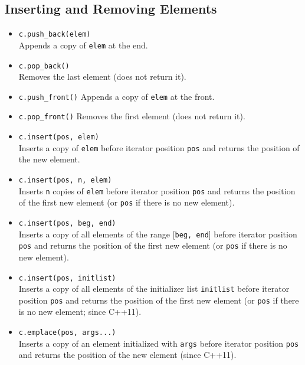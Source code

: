 \documentclass{report}
\begin{document}
\subsection{Inserting and Removing Elements}
\begin{itemize}
    \item \texttt{c.push\_back(elem)} \\
          Appends a copy of \texttt{elem} at the end.
          
    \item \texttt{c.pop\_back()} \\
          Removes the last element (does not return it).
    
  \item \texttt{c.push\_front()}
                Appends a copy of \texttt{elem} at the front.

  \item \texttt{c.pop\_front()}
        Removes the first element (does not return it).

    \item \texttt{c.insert(pos, elem)} \\
          Inserts a copy of \texttt{elem} before iterator position \texttt{pos} and returns the position of the new element.
          
    \item \texttt{c.insert(pos, n, elem)} \\
          Inserts \texttt{n} copies of \texttt{elem} before iterator position \texttt{pos} and returns the position of the first new element (or \texttt{pos} if there is no new element).
          
    \item \texttt{c.insert(pos, beg, end)} \\
          Inserts a copy of all elements of the range [\texttt{beg, end}] before iterator position \texttt{pos} and returns the position of the first new element (or \texttt{pos} if there is no new element).
          
    \item \texttt{c.insert(pos, initlist)} \\
          Inserts a copy of all elements of the initializer list \texttt{initlist} before iterator position \texttt{pos} and returns the position of the first new element (or \texttt{pos} if there is no new element; since C++11).
          
    \item \texttt{c.emplace(pos, args...)} \\
          Inserts a copy of an element initialized with \texttt{args} before iterator position \texttt{pos} and returns the position of the new element (since C++11).
          

\end{itemize}
\end{document}
